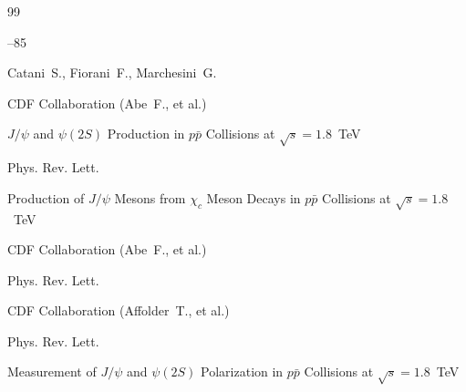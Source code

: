 \begin{thebibliography}{99}


--85

\by  Catani~S.,  Fiorani~F.,  Marchesini~G.






\by  CDF Collaboration (Abe~F., et al.)

\paper $J/\psi$ and $\psi(2S)$ Production in $p\bar p$  Collisions at ${\sqrt s=1.8}$~TeV

\jour Phys. Rev. Lett. 








\paper Production of $J/\psi$ Mesons from $\chi_c$ Meson Decays in $p\bar p$ Collisions at $\sqrt s=1.8$~TeV


\by  CDF Collaboration (Abe~F., et al.)

\jour Phys. Rev. Lett. 









\by CDF Collaboration (Affolder~T., et al.)

\jour Phys. Rev. Lett.





\paper Measurement of $J/\psi$ and $\psi(2S)$ Polarization in $p\bar p$  Collisions at $\sqrt s=1.8$~TeV








\end{thebibliography}

